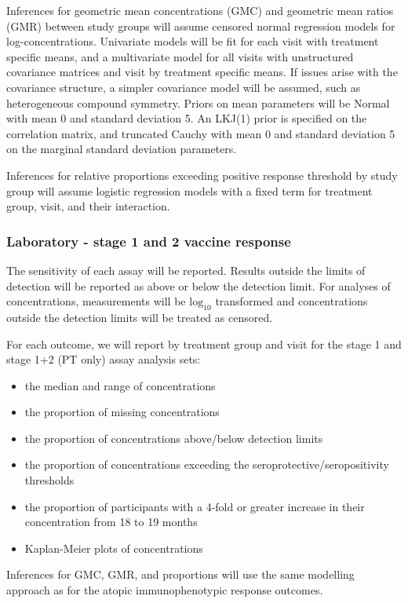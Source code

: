 \documentclass{bmcart}
\begin{document}
Inferences for geometric mean concentrations (GMC) and geometric mean ratios (GMR) between study groups will assume censored normal regression models for log-concentrations. 
Univariate models will be fit for each visit with treatment specific means, and a multivariate model for all visits with unstructured covariance matrices and visit by treatment specific means.
If issues arise with the covariance structure, a simpler covariance model will be assumed, such as heterogeneous compound symmetry.
Priors on mean parameters will be Normal with mean 0 and standard deviation 5. An LKJ(1) prior is specified on the correlation matrix, and truncated Cauchy with mean 0 and standard deviation 5 on the marginal standard deviation parameters.

Inferences for relative proportions exceeding positive response threshold by study group will assume logistic regression models with a fixed term for treatment group, visit, and their interaction.

\subsubsection*{Laboratory - stage 1 and 2 vaccine response}

The sensitivity of each assay will be reported. Results outside the limits of detection will be reported as above or below the detection limit. For analyses of concentrations, measurements will be $\text{log}_{10}$ transformed and concentrations outside the detection limits will be treated as censored.

For each outcome, we will report by treatment group and visit for the stage 1 and stage 1+2 (PT only) assay analysis sets:
\begin{itemize}
	\item the median and range of concentrations
	\item the proportion of missing concentrations
	\item the proportion of concentrations above/below detection limits
	\item the proportion of concentrations exceeding the seroprotective/seropositivity thresholds
	\item the proportion of participants with a 4-fold or greater increase in their concentration from 18 to 19 months 
	\item Kaplan-Meier plots of concentrations
\end{itemize}

Inferences for GMC, GMR, and proportions will use the same modelling approach as for the atopic immunophenotypic response outcomes.
\end{document}
